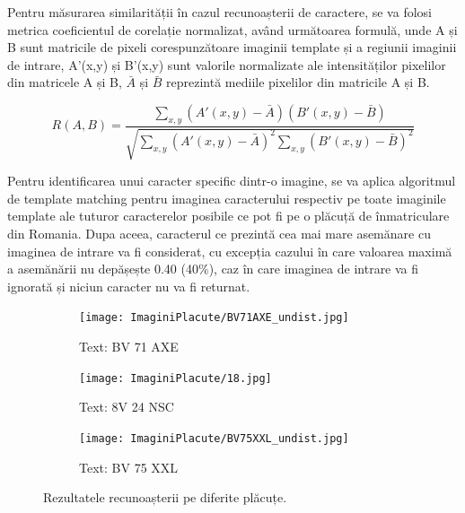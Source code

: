 \documentclass[12pt]{article}
\begin{document}
Pentru m\u{a}surarea similarit\u{a}ții \^{i}n cazul recunoașterii de caractere, se va folosi metrica coeficientul de corelație normalizat, av\^{a}nd urm\u{a}toarea formul\u{a}, unde A și B sunt matricile de pixeli corespunz\u{a}toare imaginii template și a regiunii imaginii de intrare, A'(x,y) și B'(x,y) sunt valorile normalizate ale intensit\u{a}ților pixelilor din matricele A și B, \ensuremath{\bar{A}} și \ensuremath{\bar{B}} reprezint\u{a} mediile pixelilor din matricile A și B.

\begin{equation}
R(A, B) = \frac{\sum_{x,y} (A'(x,y) - \bar{A})(B'(x,y) - \bar{B})}{\sqrt{\sum_{x,y} (A'(x,y) - \bar{A})^2 \sum_{x,y} (B'(x,y) - \bar{B})^2}}
\end{equation}

Pentru identificarea unui caracter specific dintr-o imagine, se va aplica algoritmul de template matching pentru imaginea caracterului respectiv pe toate imaginile template ale tuturor caracterelor posibile ce pot fi pe o pl\u{a}cuț\u{a} de \^{i}nmatriculare din Romania. Dupa aceea, caracterul ce prezint\u{a} cea mai mare asem\u{a}nare cu imaginea de intrare va fi considerat, cu excepția cazului \^{i}n care valoarea maxim\u{a} a asem\u{a}n\u{a}rii nu dep\u{a}șește 0.40 (40\%), caz \^{i}n care imaginea de intrare va fi ignorat\u{a} și niciun caracter nu va fi returnat.

\begin{figure}[htbp]
    \centering
    \begin{subfigure}{0.3\textwidth}
        \texttt{[image: ImaginiPlacute/BV71AXE\_undist.jpg]}
        \caption{Text: BV 71 AXE}
        \label{fig:img1}
    \end{subfigure}
    \hfill
    \begin{subfigure}{0.3\textwidth}
        \texttt{[image: ImaginiPlacute/18.jpg]}
        \caption{Text: 8V 24 NSC}
        \label{fig:img2}
    \end{subfigure}
    \hfill
    \begin{subfigure}{0.3\textwidth}
        \texttt{[image: ImaginiPlacute/BV75XXL\_undist.jpg]}
        \caption{Text: BV 75 XXL}
        \label{fig:img3}
    \end{subfigure}
    \caption{Rezultatele recunoașterii pe diferite pl\u{a}cuțe.}
    \label{fig:rezultate_recunoastere_text}
\end{figure}
\end{document}
